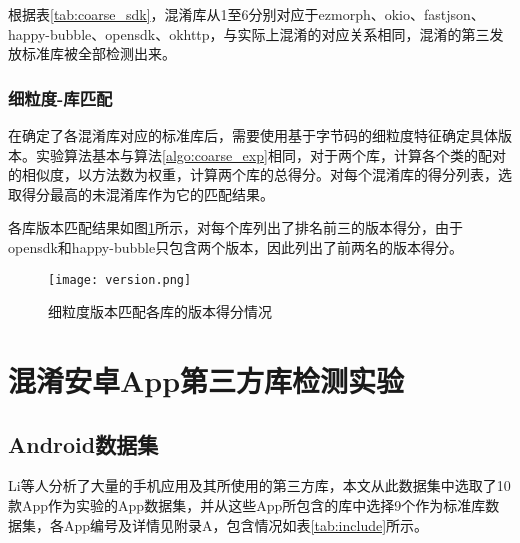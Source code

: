根据表\ref{tab:coarse_sdk}，混淆库从1至6分别对应于ezmorph、okio、fastjson、happy-bubble、opensdk、okhttp，与实际上混淆的对应关系相同，混淆的第三发放标准库被全部检测出来。


\subsubsection{细粒度-库匹配}

在确定了各混淆库对应的标准库后，需要使用基于字节码的细粒度特征确定具体版本。实验算法基本与算法\ref{algo:coarse_exp}相同，对于两个库，计算各个类的配对的相似度，以方法数为权重，计算两个库的总得分。对每个混淆库的得分列表，选取得分最高的未混淆库作为它的匹配结果。


各库版本匹配结果如图\ref{fig:version}所示，对每个库列出了排名前三的版本得分，由于opensdk和happy-bubble只包含两个版本，因此列出了前两名的版本得分。

\begin{figure}[!htp]
  \centering
  \texttt{[image: version.png]} \\
  \caption{细粒度版本匹配各库的版本得分情况}
 \label{fig:version}
\end{figure}



\section{混淆安卓App第三方库检测实验}

\subsection{Android数据集}
Li\cite{li2021embedding}等人分析了大量的手机应用及其所使用的第三方库，本文从此数据集中选取了10款App作为实验的App数据集，并从这些App所包含的库中选择9个作为标准库数据集，各App编号及详情见附录A，包含情况如表\ref{tab:include}所示。

